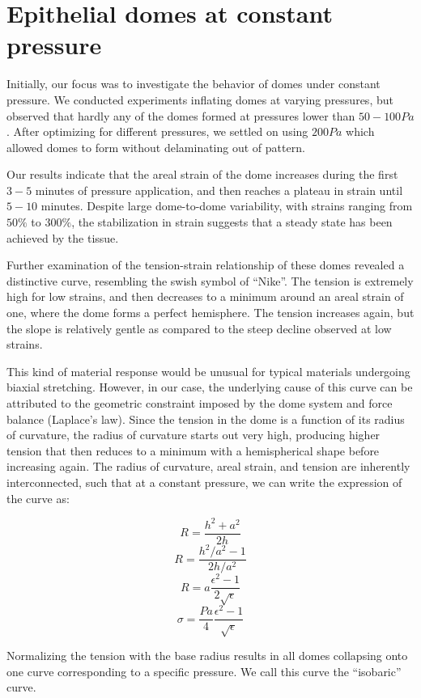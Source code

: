 \hypertarget{epithelial-domes-at-constant-pressure}{%
	\section{Epithelial domes at constant
		pressure}\label{epithelial-domes-at-constant-pressure}}

Initially, our focus was to investigate the behavior of domes under
constant pressure. We conducted experiments inflating domes at varying
pressures, but observed that hardly any of the domes formed at pressures
lower than \(50-100 Pa\). After optimizing for different pressures, we
settled on using \(200 Pa\) which allowed domes to form without
delaminating out of pattern.

Our results indicate that the areal strain of the dome increases during
the first \(3-5\) minutes of pressure application, and then reaches a
plateau in strain until \(5-10\) minutes. Despite large dome-to-dome
variability, with strains ranging from \(50\%\) to \(300\%\), the
stabilization in strain suggests that a steady state has been achieved
by the tissue.

Further examination of the tension-strain relationship of these domes
revealed a distinctive curve, resembling the swish symbol of ``Nike''.
The tension is extremely high for low strains, and then decreases to a
minimum around an areal strain of one, where the dome forms a perfect
hemisphere. The tension increases again, but the slope is relatively
gentle as compared to the steep decline observed at low strains.

This kind of material response would be unusual for typical materials
undergoing biaxial stretching. However, in our case, the underlying
cause of this curve can be attributed to the geometric constraint
imposed by the dome system and force balance (Laplace's law). Since the
tension in the dome is a function of its radius of curvature, the radius
of curvature starts out very high, producing higher tension that then
reduces to a minimum with a hemispherical shape before increasing again.
The radius of curvature, areal strain, and tension are inherently
interconnected, such that at a constant pressure, we can write the
expression of the curve as:

\[ R = \frac{h^2 + a^2}{2h} \] \[ R = \frac{h^2/a^2 - 1}{2h/a^2} \]
\[ R = a\frac{\epsilon^2 - 1}{2\sqrt{\epsilon}} \]
\[ \sigma = \frac{Pa}{4} \frac{\epsilon^2 - 1}{\sqrt{\epsilon}}\]

Normalizing the tension with the base radius results in all domes
collapsing onto one curve corresponding to a specific pressure. We call
this curve the ``isobaric'' curve.

